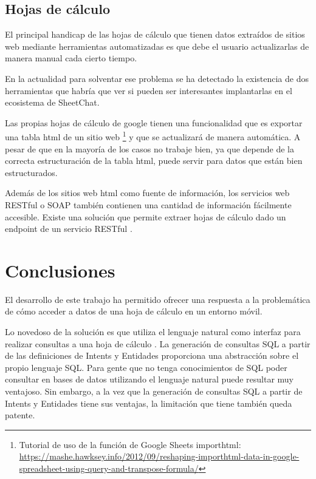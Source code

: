 \subsection{Hojas de cálculo}

El principal handicap de las hojas de cálculo que tienen datos extraídos de sitios web mediante herramientas automatizadas es que debe el usuario actualizarlas de manera manual cada cierto tiempo.

En la actualidad para solventar ese problema se ha detectado la existencia de dos herramientas que habría que ver si pueden ser interesantes implantarlas en el ecosistema de SheetChat.

Las propias hojas de cálculo de google tienen una funcionalidad que es exportar una tabla html de un sitio web \footnote{Tutorial de uso de la función de Google Sheets importhtml: \url{https://mashe.hawksey.info/2012/09/reshaping-importhtml-data-in-google-spreadsheet-using-query-and-transpose-formula/}} y que se actualizará de manera automática. A pesar de que en la mayoría de los casos no trabaje bien, ya que depende de la correcta estructuración de la tabla html, puede servir para datos que están bien estructurados.

Además de los sitios web html como fuente de información, los servicios web RESTful o SOAP también contienen una cantidad de información fácilmente accesible. Existe una solución que permite extraer hojas de cálculo dado un endpoint de un servicio RESTful \cite{Chang2014}.

\section{Conclusiones}
\label{sec:Conclusions}

El desarrollo de este trabajo ha permitido ofrecer una respuesta a la problemática de cómo acceder a datos de una hoja de cálculo en un entorno móvil.

Lo novedoso de la solución es que utiliza el lenguaje natural como interfaz para realizar consultas a una hoja de cálculo \cite{Flood2010}. La generación de consultas SQL a partir de las definiciones de Intents y Entidades proporciona una abstracción sobre el propio lenguaje SQL. Para gente que no tenga conocimientos de SQL poder consultar en bases de datos utilizando el lenguaje natural puede resultar muy ventajoso. Sin embargo, a la vez que la generación de consultas SQL a partir de Intents y Entidades tiene sus ventajas, la limitación que tiene también queda patente.

